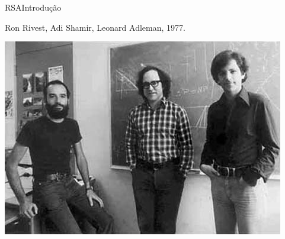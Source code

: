 

\lecturetitle{\insertlecture}{\course}
\frame{\maketitle}

\begin{frame}{RSA}{Introdução}

Ron \alert{R}ivest, Adi \alert{S}hamir, Leonard \alert{A}dleman, 1977.

\begin{center}
\includegraphics[scale=.4]{img/rsa.png}
\end{center}

\end{frame}

